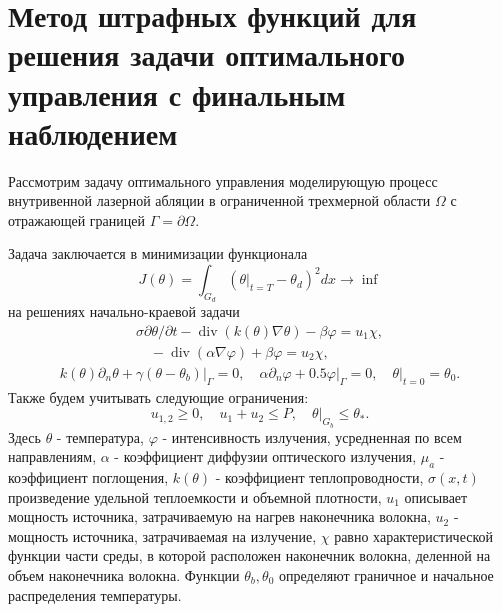 \section{Метод штрафных функций для решения задачи
оптимального управления с финальным наблюдением}
\label{sec:ch3:sec3}

%
%
Рассмотрим задачу оптимального управления моделирующую процесс
внутривенной лазерной абляции в ограниченной трехмерной области
$\Omega$ с отражающей границей $\Gamma=\partial\Omega$.

Задача заключается в минимизации функционала
\[
    J(\theta)=\int_{G_{d}}\left(\left.\theta\right|_{t=T}
    -\theta_{d}\right)^{2} d x \rightarrow \inf
\]
на решениях начально-краевой задачи
\begin{gather}
    \label{eq:3_3:1}
    \sigma \partial \theta / \partial t-\operatorname{div}(k(\theta) \nabla \theta)
    -\beta \varphi=u_{1} \chi, \\
    \quad-\operatorname{div}(\alpha \nabla \varphi)+\beta \varphi= u_{2} \chi,
\end{gather}
\begin{gather}
    \label{eq:3_3:2}
    k(\theta) \partial_{n} \theta+\left.\gamma
    \left(\theta-\theta_{b}\right)\right|_{\Gamma}=0,
    \quad \alpha \partial_{n} \varphi +
    \left.0.5 \varphi\right|_{\Gamma}=0,\left.\quad \theta\right|_{t=0}=\theta_{0}.
\end{gather}
Также будем учитывать следующие ограничения:
\[
    u_{1,2} \geq 0, \quad u_{1}+u_{2} \leq P,\left.\quad \theta\right|_{G_{b}} \leq \theta_{*}.
\]
Здесь $\theta$ - температура, $\varphi$ - интенсивность излучения, усредненная по всем направлениям,
$\alpha$ - коэффициент диффузии оптического излучения, $\mu_{a}$ - коэффициент поглощения,
$k(\theta)$ - коэффициент теплопроводности, $\sigma(x, t)$ произведение удельной теплоемкости
и объемной плотности, $u_{1}$ описывает мощность источника, затрачиваемую
на нагрев наконечника волокна, $u_{2}$ - мощность источника, затрачиваемая на излучение,
$\chi$ равно характеристической функции части среды, в которой расположен наконечник волокна,
деленной на объем наконечника волокна.
Функции $\theta_{b}, \theta_{0}$ определяют граничное и начальное распределения температуры.

